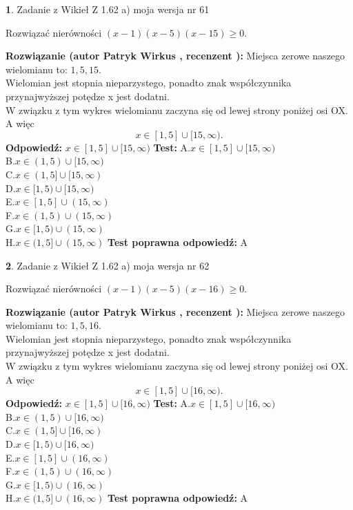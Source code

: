 \documentclass[12pt, a4paper]{article}
\theoremstyle{definition} %
\newtheorem{zad}{}
\newcommand{\zadStart}[1]{\begin{zad}#1\newline}
\newcommand{\zadStop}{\end{zad}}
\newcommand{\rozwStart}[2]{\noindent \textbf{Rozwiązanie (autor #1 , recenzent #2): }\newline}
\newcommand{\rozwStop}{\newline}
\newcommand{\odpStart}{\noindent \textbf{Odpowiedź:}\newline}
\newcommand{\odpStop}{\newline}
\newcommand{\testStart}{\noindent \textbf{Test:}\newline}
\newcommand{\testStop}{\newline}
\newcommand{\kluczStart}{\noindent \textbf{Test poprawna odpowiedź:}\newline}
\newcommand{\kluczStop}{\newline}
\begin{document}
\zadStart{Zadanie z Wikieł Z 1.62 a) moja wersja nr 61}

Rozwiązać nierówności $(x-1)(x-5)(x-15)\ge0$.
\zadStop
\rozwStart{Patryk Wirkus}{}
Miejsca zerowe naszego wielomianu to: $1, 5, 15$.\\
Wielomian jest stopnia nieparzystego, ponadto znak współczynnika przy\linebreak najwyższej potędze x jest dodatni.\\ W związku z tym wykres wielomianu zaczyna się od lewej strony poniżej osi OX. A więc $$x \in [1,5] \cup [15,\infty).$$
\rozwStop
\odpStart
$x \in [1,5] \cup [15,\infty)$
\odpStop
\testStart
A.$x \in [1,5] \cup [15,\infty)$\\
B.$x \in (1,5) \cup [15,\infty)$\\
C.$x \in (1,5] \cup [15,\infty)$\\
D.$x \in [1,5) \cup [15,\infty)$\\
E.$x \in [1,5] \cup (15,\infty)$\\
F.$x \in (1,5) \cup (15,\infty)$\\
G.$x \in [1,5) \cup (15,\infty)$\\
H.$x \in (1,5] \cup (15,\infty)$
\testStop
\kluczStart
A
\kluczStop



\zadStart{Zadanie z Wikieł Z 1.62 a) moja wersja nr 62}

Rozwiązać nierówności $(x-1)(x-5)(x-16)\ge0$.
\zadStop
\rozwStart{Patryk Wirkus}{}
Miejsca zerowe naszego wielomianu to: $1, 5, 16$.\\
Wielomian jest stopnia nieparzystego, ponadto znak współczynnika przy\linebreak najwyższej potędze x jest dodatni.\\ W związku z tym wykres wielomianu zaczyna się od lewej strony poniżej osi OX. A więc $$x \in [1,5] \cup [16,\infty).$$
\rozwStop
\odpStart
$x \in [1,5] \cup [16,\infty)$
\odpStop
\testStart
A.$x \in [1,5] \cup [16,\infty)$\\
B.$x \in (1,5) \cup [16,\infty)$\\
C.$x \in (1,5] \cup [16,\infty)$\\
D.$x \in [1,5) \cup [16,\infty)$\\
E.$x \in [1,5] \cup (16,\infty)$\\
F.$x \in (1,5) \cup (16,\infty)$\\
G.$x \in [1,5) \cup (16,\infty)$\\
H.$x \in (1,5] \cup (16,\infty)$
\testStop
\kluczStart
A
\kluczStop
\end{document}
